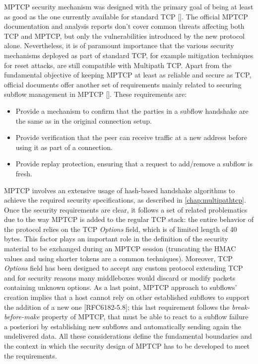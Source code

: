 MPTCP security mechanism was designed with the primary goal of being at least as good as the one currently available for standard TCP []. The official MPTCP documentation and analysis reports don't cover common threats affecting both TCP and MPTCP, but only the vulnerabilities introduced by the new protocol alone. Nevertheless, it is of paramount importance that the various security mechanisms deployed as part of standard TCP, for example mitigation techniques for reset attacks, are still compatible with Multipath TCP. Apart from the fundamental objective of keeping MPTCP at least as reliable and secure as TCP, official documents offer another set of requirements mainly related to securing subflow management in MPTCP []. These requirements are:
\begin{itemize} 
\item Provide a mechanism to confirm that the parties in a subflow handshake are the same as in the original connection setup.

\item Provide verification that the peer can receive traffic at a new address before using it as part of a connection.

\item Provide replay protection, ensuring that a request to add/remove a subflow is fresh.
\end{itemize}

MPTCP involves an extensive usage of hash-based handshake algorithms to achieve the required security specifications, as described in \autoref{chap:multipathtcp}. 
Once the security requirements are clear, it follows a set of related problematics due to the way MPTCP is added to the regular TCP stack: the entire behavior of the protocol relies on the TCP \textit{Options} field, which is of limited length of 40 bytes. This factor plays an important role in the definition of the security material to be exchanged during an MPTCP session (truncating the HMAC values and using shorter tokens are a common techniques). Moreover, TCP \textit{Options} field has been designed to accept any custom protocol extending TCP and for security reasons many middleboxes would discard or modify packets containing unknown options. As a last point, MPTCP approach to subflows' creation implies that a host cannot rely on other established subflows to support the addition of a new one [RFC6182-5.8]; this last requirement follows the \textit{break-before-make} property of MPTCP, that must be able to react to a subflow failure a posteriori by establishing new subflows and automatically sending again the undelivered data. All these considerations define the fundamental boundaries and the context in which the security design of MPTCP has to be developed to meet the requirements.

